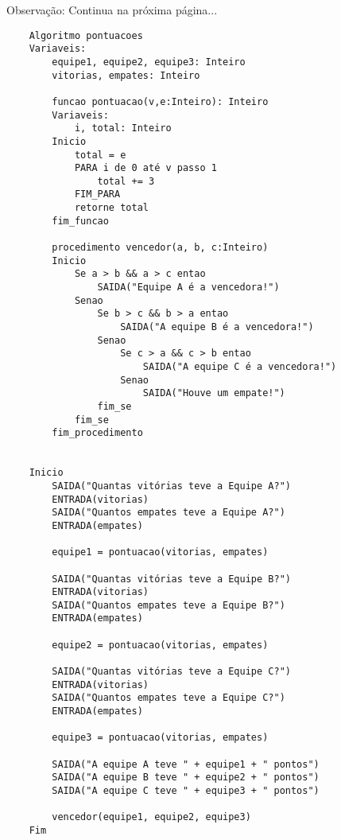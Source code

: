 \documentclass[11pt]{article}
\begin{document}
Observação: Continua na próxima página...

\begin{verbatim}
    Algoritmo pontuacoes
    Variaveis:
        equipe1, equipe2, equipe3: Inteiro
        vitorias, empates: Inteiro

        funcao pontuacao(v,e:Inteiro): Inteiro
        Variaveis:
            i, total: Inteiro
        Inicio
            total = e
            PARA i de 0 até v passo 1
                total += 3
            FIM_PARA
            retorne total
        fim_funcao

        procedimento vencedor(a, b, c:Inteiro)
        Inicio
            Se a > b && a > c entao
                SAIDA("Equipe A é a vencedora!")
            Senao
                Se b > c && b > a entao
                    SAIDA("A equipe B é a vencedora!")
                Senao
                    Se c > a && c > b entao
                        SAIDA("A equipe C é a vencedora!")
                    Senao
                        SAIDA("Houve um empate!")
                fim_se
            fim_se
        fim_procedimento


    Inicio
        SAIDA("Quantas vitórias teve a Equipe A?")
        ENTRADA(vitorias)
        SAIDA("Quantos empates teve a Equipe A?")
        ENTRADA(empates)

        equipe1 = pontuacao(vitorias, empates)

        SAIDA("Quantas vitórias teve a Equipe B?")
        ENTRADA(vitorias)
        SAIDA("Quantos empates teve a Equipe B?")
        ENTRADA(empates)

        equipe2 = pontuacao(vitorias, empates)

        SAIDA("Quantas vitórias teve a Equipe C?")
        ENTRADA(vitorias)
        SAIDA("Quantos empates teve a Equipe C?")
        ENTRADA(empates)

        equipe3 = pontuacao(vitorias, empates)

        SAIDA("A equipe A teve " + equipe1 + " pontos")
        SAIDA("A equipe B teve " + equipe2 + " pontos")
        SAIDA("A equipe C teve " + equipe3 + " pontos")

        vencedor(equipe1, equipe2, equipe3)
    Fim


\end{verbatim}
\end{document}
